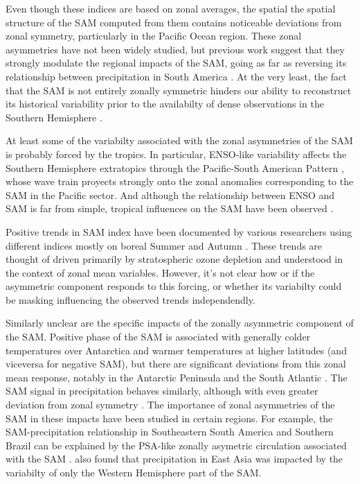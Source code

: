 \documentclass[]{ametsocV5}
\begin{document}
Even though these indices are based on zonal averages, the spatial the
spatial structure of the SAM computed from them contains noticeable
deviations from zonal symmetry, particularly in the Pacific Ocean
region. These zonal asymmetries have not been widely studied, but
previous work suggest that they strongly modulate the regional impacts
of the SAM, going as far as reversing its relationship between
precipitation in South America \citep{silvestri2009}. At the very least,
the fact that the SAM is not entirely zonally symmetric hinders our
ability to reconstruct its historical variability prior to the
availabilty of dense observations in the Southern Hemisphere
\citep{jones2009}.

At least some of the variabilty associated with the zonal asymmetries of
the SAM is probably forced by the tropics. In particular, ENSO-like
variability affects the Southern Hemisphere extratopics through the
Pacific-South American Pattern \citep{mo1987, kidson1988, karoly1989},
whose wave train proyects strongly onto the zonal anomalies
corresponding to the SAM in the Pacific sector. And although the
relationship between ENSO and SAM is far from simple, tropical
influences on the SAM have been observed
\citep{fan2007, fogt2011, clem2013}.

Positive trends in SAM index have been documented by various researchers
using different indices mostly on boreal Summer and Autumn \citep[ and
references therein]{fogt2020}. These trends are thought of driven
primarily by stratospheric ozone depletion and understood in the context
of zonal mean variables. However, it's not clear how or if the
asymmetric component responds to this forcing, or whether its variabilty
could be masking influencing the observed trends independendly.

Similarly unclear are the specific impacts of the zonally asymmetric
component of the SAM. Positive phase of the SAM is associated with
generally colder temperatures over Antarctica and warmer temperatures at
higher latitudes \citep{jones2019} (and viceversa for negative SAM), but
there are significant deviations from this zonal mean response, notably
in the Antarctic Peninsula and the South Atlantic \citep{fogt2012}. The
SAM signal in precipitation behaves similarly, although with even
greater deviation from zonal symmetry \citep{lim2016}. The importance of
zonal asymmetries of the SAM in these impacts have been studied in
certain regions. For example, the SAM-precipitation relationship in
Southeastern South America and Southern Brazil can be explained by the
PSA-like zonally asymetric circulation associated with the SAM
\citep{silvestry2009, rosso2018}. \citet{fan2007} also found that
precipitation in East Asia was impacted by the variabilty of only the
Western Hemisphere part of the SAM.
\end{document}
